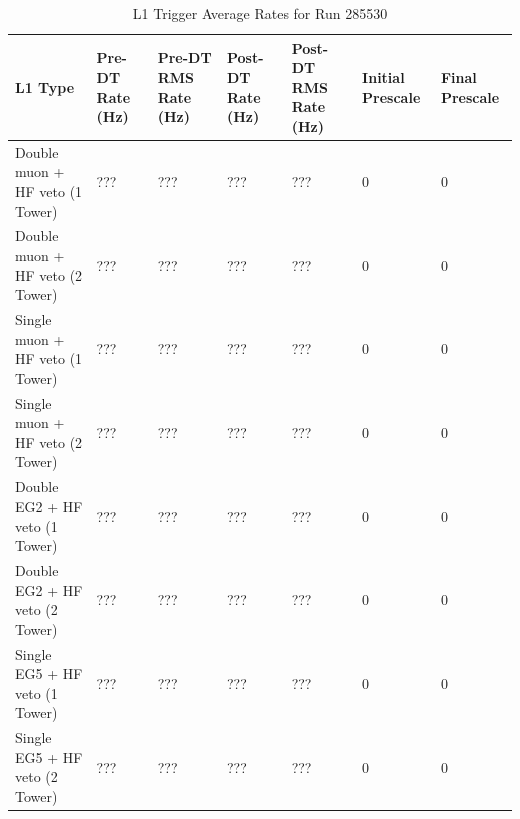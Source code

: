 \begin{table}[h!]
\centering
\caption{L1 Trigger Average Rates for Run 285530}
\label{my-label}
\begin{tabular}{@{}l|p{1.6cm}|p{1.6cm}|p{1.6cm}|p{1.6cm}|p{1.3cm}|p{1.3cm}|}
\toprule
L1 Type                           & Pre-DT Rate (Hz) & Pre-DT RMS Rate (Hz) & Post-DT Rate (Hz) & Post-DT RMS Rate (Hz) & Initial Prescale & Final Prescale \\ \midrule
Double muon + HF veto (1 Tower) & ???             & ???                 & ???              & ???                  & 0                & 0              \\
Double muon + HF veto (2 Tower) & ???             & ???                 & ???              & ???                  & 0                & 0              \\
Single muon + HF veto (1 Tower) & ???            & ???                & ???             & ???                 & 0                & 0              \\
Single muon + HF veto (2 Tower) & ???            & ???                & ???             & ???                 & 0                & 0              \\
Double EG2 + HF veto (1 Tower)  & ???             & ???                 & ???              & ???                  & 0                & 0              \\
Double EG2 + HF veto (2 Tower)  & ???             & ???                 & ???              & ???                  & 0                & 0              \\
Single EG5 + HF veto (1 Tower)  & ???            & ???                & ???              & ???                 & 0                & 0              \\ 
Single EG5 + HF veto (2 Tower)  & ???            & ???                & ???              & ???                 & 0                & 0              \\ 
\bottomrule
\end{tabular}
\end{table}

